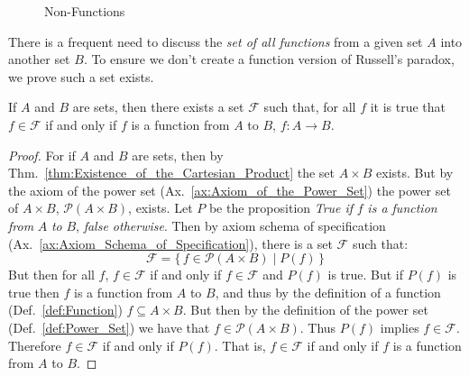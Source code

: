         \begin{figure}[H]
            \centering
            \begin{subfigure}[b]{0.49\textwidth}
                \centering
                \resizebox{\textwidth}{!}{%
                    
                }
            \end{subfigure}
            \begin{subfigure}[b]{0.49\textwidth}
                \centering
                \resizebox{\textwidth}{!}{%
                    
                }
            \end{subfigure}
            \caption{Non-Functions}
            \label{fig:Abstract_Non_Functions}
        \end{figure}
        There is a frequent need to discuss the \textit{set of all functions}
        from a given set $A$ into another set $B$. To ensure we don't create
        a function version of Russell's paradox, we prove such a set exists.
        \begin{theorem}
            If $A$ and $B$ are sets, then there exists a set $\mathcal{F}$ such
            that, for all $f$ it is true that $f\in\mathcal{F}$ if and only if
            $f$ is a function from $A$ to $B$, $f:A\rightarrow{B}$.
        \end{theorem}
        \begin{proof}
            For if $A$ and $B$ are sets, then by
            Thm.~\ref{thm:Existence_of_the_Cartesian_Product} the set
            $A\times{B}$ exists. But by the axiom of the power set
            (Ax.~\ref{ax:Axiom_of_the_Power_Set}) the power set of $A\times{B}$,
            $\mathcal{P}(A\times{B})$, exists. Let $P$ be the proposition
            \textit{True if} $f$ \textit{is a function from} $A$ \textit{to}
            $B$, \textit{false otherwise}. Then by axiom schema of specification
            (Ax.~\ref{ax:Axiom_Schema_of_Specification}), there is a set
            $\mathcal{F}$ such that:
            \begin{equation}
                \mathcal{F}=\big\{\,f\in\mathcal{P}(A\times{B})\;|
                    \;P(f)\,\big\}
            \end{equation}
            But then for all $f$, $f\in\mathcal{F}$ if and only if
            $f\in\mathcal{F}$ and $P(f)$ is true. But if $P(f)$ is true then
            $f$ is a function from $A$ to $B$, and thus by the definition of a
            function (Def.~\ref{def:Function}) $f\subseteq{A}\times{B}$. But
            then by the definition of the power set (Def.~\ref{def:Power_Set})
            we have that $f\in\mathcal{P}(A\times{B})$. Thus $P(f)$ implies
            $f\in\mathcal{F}$. Therefore $f\in\mathcal{F}$ if and only if
            $P(f)$. That is, $f\in\mathcal{F}$ if and only if $f$ is a function
            from $A$ to $B$.
        \end{proof}
